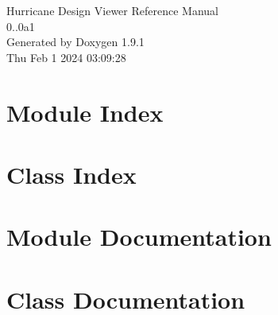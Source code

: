 \documentclass[a4paper]{asimbook}
\begin{document}
   \begin{titlepage}
     \vspace*{7cm}
     \begin{center}
     {\Large Hurricane Design Viewer Reference Manual\\[1ex]\large 0..\+0a1 }\\
     \vspace*{1cm}
     {\large Generated by Doxygen 1.9.1}\\
     \vspace*{0.5cm}
     {\small Thu Feb 1 2024 03:09:28}\\
     \end{center}
   \end{titlepage}

   \clearemptydoublepage

   \tableofcontents
   \clearemptydoublepage

\chapter{Module Index}

\chapter{Class Index}

\chapter{Module Documentation}

\chapter{Class Documentation}








\backmatter
\newpage
{}
\clearemptydoublepage
{}
\printindex
\end{document}
